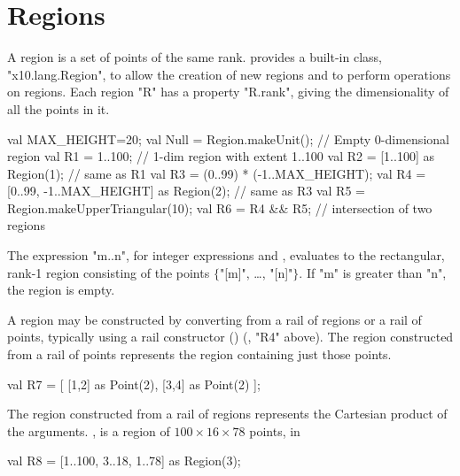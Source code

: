 \section{Regions}\label{XtenRegions}

A region is a set of points of the same rank.  {}\Xten{}
provides a built-in class, \xcd"x10.lang.Region", to allow the
creation of new regions and to perform operations on regions. 
Each region \xcd"R" has a property \xcd"R.rank", giving the dimensionality of
all the points in it.

\begin{xten}
val MAX_HEIGHT=20;
val Null = Region.makeUnit();  // Empty 0-dimensional region          
val R1 = 1..100; // 1-dim region with extent 1..100
val R2 = [1..100] as Region(1); // same as R1
val R3 = (0..99) * (-1..MAX_HEIGHT);   
val R4  = [0..99, -1..MAX_HEIGHT] as Region(2); // same as R3  
val R5 = Region.makeUpperTriangular(10);
val R6 = R4 && R5; // intersection of two regions
\end{xten}

The expression \xcdmath"m..n", for integer expressions  and ,
evaluates to the rectangular, rank-1 region consisting of the points
$\{$\xcdmath"[m]", \dots, \xcdmath"[n]"$\}$. If \xcdmath"m" is greater than
\xcdmath"n", the region  is empty.

A region may be constructed by converting from a rail of
regions or a rail of points, typically using a rail constructor
()
(\eg, \xcd"R4" above).
The region constructed from a rail of points represents the
region containing just those points.
\begin{xten}
val R7 = [ [1,2] as Point(2), [3,4] as Point(2) ];
\end{xten}
The region constructed from a rail of regions represents the Cartesian product
of the arguments. \Eg,  is a region of {$100 \times 16 \times 78$}
points, in
\begin{xten}
  val R8 = [1..100, 3..18, 1..78] as Region(3);
\end{xten}



